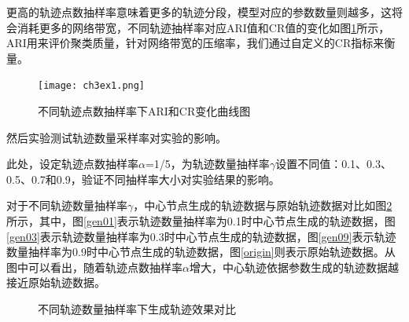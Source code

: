 更高的轨迹点数抽样率意味着更多的轨迹分段，模型对应的参数数量则越多，这将会消耗更多的网络带宽，不同轨迹抽样率对应ARI值和CR值的变化如图\ref{ch3ricr1}所示，ARI用来评价聚类质量，针对网络带宽的压缩率，我们通过自定义的CR指标来衡量。
\begin{figure}[H]
	\texttt{[image: ch3ex1.png]}
	\caption{不同轨迹点数抽样率下ARI和CR变化曲线图}
	\label{ch3ricr1}
\end{figure}


然后实验测试轨迹数量采样率对实验的影响。

此处，设定轨迹点数抽样率$\alpha$=1/5，为轨迹数量抽样率$\gamma$设置不同值：0.1、0.3、0.5、0.7和0.9，验证不同抽样率大小对实验结果的影响。

对于不同轨迹数量抽样率$\gamma$，中心节点生成的轨迹数据与原始轨迹数据对比如图\ref{genTrForDifferentGamma}所示，其中，图\ref{gen01}表示轨迹数量抽样率为0.1时中心节点生成的轨迹数据，图\ref{gen03}表示轨迹数量抽样率为0.3时中心节点生成的轨迹数据，图\ref{gen09}表示轨迹数量抽样率为0.9时中心节点生成的轨迹数据，图\ref{origin}则表示原始轨迹数据。从图中可以看出，随着轨迹点数抽样率$\alpha$增大，中心轨迹依据参数生成的轨迹数据越接近原始轨迹数据。
\begin{figure}[H]
\caption{不同轨迹数量抽样率下生成轨迹效果对比}
\label{genTrForDifferentGamma}
\end{figure}


